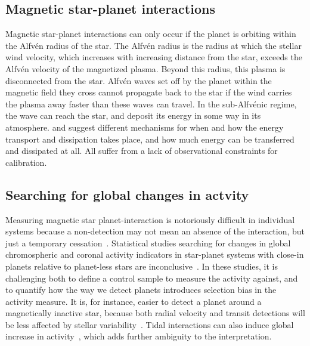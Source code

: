 \documentclass[twocolumn]{aastex631}
\begin{document}
\subsection{Magnetic star-planet interactions}
\label{sec:intro:mspi}
Magnetic star-planet interactions can only occur if the planet is orbiting within the Alfv\'en radius of the star. The Alfv\'en radius is the radius at which the stellar wind velocity, which increases with increasing distance from the star, exceeds the Alfv\'en velocity of the magnetized plasma. Beyond this radius, this plasma is disconnected from the star. Alfv\'en waves set off by the planet within the magnetic field they cross cannot propagate back to the star if the wind carries the plasma away faster than these waves can travel. In the sub-Alfv\'enic regime, the wave can reach the star, and deposit its energy in some way in its atmosphere. \citet{lanza2012starplanet, lanza2018closeby} and \citet{zarka2007plasma, saur2013magnetic} suggest different mechanisms for when and how the energy transport and dissipation takes place, and how much energy can be transferred and dissipated at all. All suffer from a lack of observational constraints for calibration.

\subsection{Searching for global changes in actvity}
\label{sec:intro:global}
Measuring magnetic star planet-interaction is notoriously difficult in individual systems because a non-detection may not mean an absence of the interaction, but just a temporary cessation~\citep{shkolnik2005hot, shkolnik2008nature}. Statistical studies searching for changes in global chromospheric and coronal activity indicators in star-planet systems with close-in planets relative to planet-less stars are inconclusive~\citep{kashyap2008extrasolar,scharf2010possible, shkolnik2013ultraviolet, france2018farultraviolet, viswanath2020statistical, krejcova2012evidence, miller2015comprehensive, poppenhaeger2010coronal}. In these studies, it is challenging both to define a control sample to measure the activity against, and to quantify how the way we detect planets introduces selection bias in the activity measure. It is, for instance, easier to detect a planet around a magnetically inactive star, because both radial velocity and transit detections will be less affected by stellar variability~\citep{poppenhaeger2011correlation}. Tidal interactions can also induce global increase in activity~\citep{ilic2022tidal}, which adds further ambiguity to the interpretation.
\end{document}
